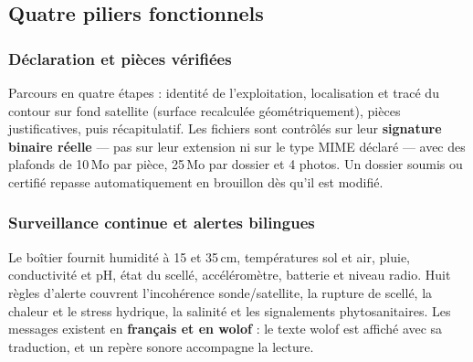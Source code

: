 \documentclass[12pt, a4paper]{article}
\begin{document}
\begin{center}
\end{center}

\subsection{Quatre piliers fonctionnels}

\subsubsection{Déclaration et pièces vérifiées}

Parcours en quatre étapes : identité de l'exploitation, localisation et tracé du contour
sur fond satellite (surface recalculée géométriquement), pièces justificatives, puis
récapitulatif. Les fichiers sont contrôlés sur leur \textbf{signature binaire réelle} — pas
sur leur extension ni sur le type MIME déclaré — avec des plafonds de 10\,Mo par pièce,
25\,Mo par dossier et 4 photos. Un dossier soumis ou certifié repasse automatiquement en
brouillon dès qu'il est modifié.

\subsubsection{Surveillance continue et alertes bilingues}

Le boîtier fournit humidité à 15 et 35\,cm, températures sol et air, pluie, conductivité
et pH, état du scellé, accéléromètre, batterie et niveau radio. Huit règles d'alerte
couvrent l'incohérence sonde/satellite, la rupture de scellé, la chaleur et le stress
hydrique, la salinité et les signalements phytosanitaires. Les messages existent en
\textbf{français et en wolof} : le texte wolof est affiché avec sa traduction, et un
repère sonore accompagne la lecture.
\end{document}
